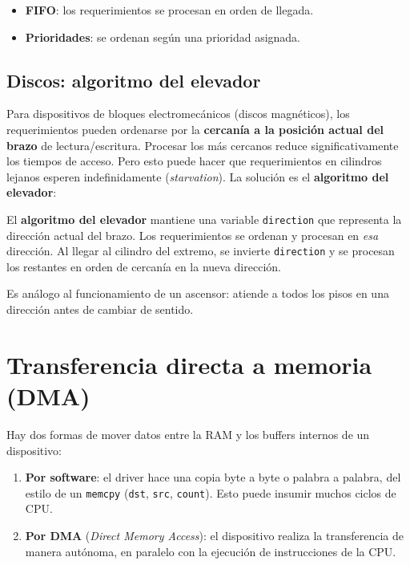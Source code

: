 \documentclass[11pt,a4paper]{article}
\begin{document}
\begin{itemize}[leftmargin=*,nosep]
    \item \textbf{FIFO}: los requerimientos se procesan en orden de
        llegada.
    \item \textbf{Prioridades}: se ordenan según una prioridad asignada.
\end{itemize}

\subsection{Discos: algoritmo del elevador}

Para dispositivos de bloques electromecánicos (discos magnéticos), los
requerimientos pueden ordenarse por la \textbf{cercanía a la posición
actual del brazo} de lectura/escritura. Procesar los más cercanos
reduce significativamente los tiempos de acceso. Pero esto puede
hacer que requerimientos en cilindros lejanos esperen indefinidamente
(\emph{starvation}). La solución es el \textbf{algoritmo del elevador}:

\begin{definicion}
El \textbf{algoritmo del elevador} mantiene una variable
\texttt{direction} que representa la dirección actual del brazo. Los
requerimientos se ordenan y procesan en \emph{esa} dirección. Al
llegar al cilindro del extremo, se invierte \texttt{direction} y se
procesan los restantes en orden de cercanía en la nueva dirección.
\end{definicion}

Es análogo al funcionamiento de un ascensor: atiende a todos los pisos
en una dirección antes de cambiar de sentido.

\section{Transferencia directa a memoria (DMA)}

Hay dos formas de mover datos entre la RAM y los buffers internos de un
dispositivo:

\begin{enumerate}[leftmargin=*]
    \item \textbf{Por software}: el driver hace una copia byte a byte
        o palabra a palabra, del estilo de un \texttt{memcpy}
        (\texttt{dst}, \texttt{src}, \texttt{count}). Esto puede
        insumir muchos ciclos de CPU.
    \item \textbf{Por DMA} (\emph{Direct Memory Access}): el dispositivo
        realiza la transferencia de manera autónoma, en paralelo con la
        ejecución de instrucciones de la CPU.
\end{enumerate}
\end{document}
